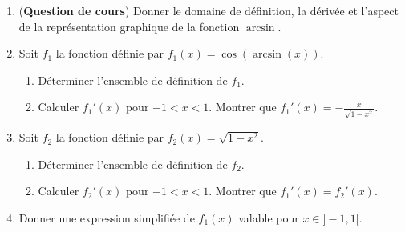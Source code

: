 
\begin{exercice}\label{exoanalyseCTU-0011}

\begin{enumerate}
\item (\textbf{Question de cours}) Donner le domaine de définition, la dérivée et l'aspect de la représentation graphique de la fonction $\arcsin$. 
\item Soit $f_1$ la fonction définie par $f_1(x)= \cos(\arcsin(x))$. 
  \begin{enumerate}
  \item Déterminer l'ensemble de définition de $f_1$.
  \item Calculer $f_1'(x)$ pour $-1<x<1$. Montrer que $\displaystyle f_1'(x) = -\frac{x}{\sqrt{1-x^2}}$.
  \end{enumerate}
\item Soit $f_2$ la fonction définie par $f_2(x)= \sqrt{1-x^2}$. 
  \begin{enumerate}
  \item Déterminer l'ensemble de définition de $f_2$.  
  \item Calculer $f_2'(x)$ pour $-1<x<1$. Montrer que $\displaystyle f_1'(x)=f_2'(x)$. 
  \end{enumerate}
\item Donner une expression simplifiée de $f_1(x)$ valable pour $x\in ]-1,1[$.
\end{enumerate}


\end{exercice}
